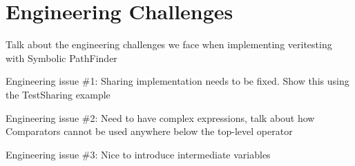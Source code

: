 \section{Engineering Challenges}
Talk about the engineering challenges we face when implementing veritesting with Symbolic PathFinder

Engineering issue \#1: Sharing implementation needs to be fixed. Show this using the TestSharing example

Engineering issue \#2: Need to have complex expressions, talk about how Comparators cannot be used anywhere below the top-level operator

Engineering issue \#3: Nice to introduce intermediate variables